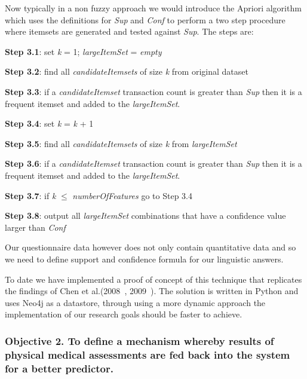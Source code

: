 \noindent
Now typically in a non fuzzy approach we would introduce the Apriori algorithm which uses the
definitions for \textit{Sup} and \textit{Conf} to perform a two step procedure where itemsets are generated and tested against \textit{Sup}. The steps are:

\noindent
\textbf{Step 3.1}: set \textit{k} = 1; \textit{largeItemSet} = \textit{empty}

\noindent
\textbf{Step 3.2}: find all \textit{candidateItemsets} of size \textit{k} from original dataset

\noindent
\textbf{Step 3.3}: if a \textit{candidateItemset} transaction count is greater than \textit{Sup} then it is a frequent itemset and added to the \textit{largeItemSet}.

\noindent
\textbf{Step 3.4}: set \textit{k} = \textit{k} + 1

\noindent
\textbf{Step 3.5}: find all \textit{candidateItemsets} of size \textit{k} from \textit{largeItemSet}

\noindent
\textbf{Step 3.6}: if a \textit{candidateItemset} transaction count is greater than \textit{Sup} then it is a frequent itemset and added to the \textit{largeItemSet}.

\noindent
\textbf{Step 3.7}: if \textit{k} $\leq$ \textit{numberOfFeatures} go to Step 3.4

\noindent
\textbf{Step 3.8}: output all \textit{largeItemSet} combinations that have a confidence value larger than \textit{Conf}

\noindent
Our questionnaire data however does not only contain quantitative data and so we need to define support and confidence formula for our linguistic answers.


To date we have implemented a proof of concept of this technique that replicates the findings of Chen et al.(2008~\cite{chen2008mining}, 2009~\cite{chen2009mining}).
The solution is written in Python and uses Neo4j as a datastore, through using a more dynamic approach the implementation of our research goals should be faster to achieve.


\subsubsection{Objective 2. To define a mechanism whereby results of physical medical assessments are fed back into the system for a better predictor.}

